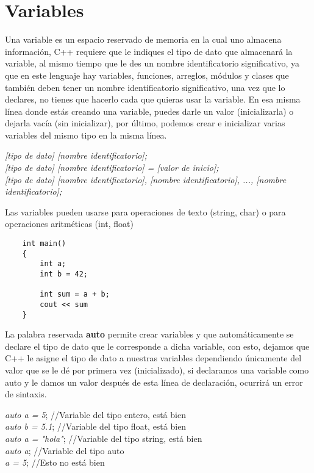 \section{Variables}
Una variable es un espacio reservado de memoria en la cual uno almacena información, C++ requiere que le indiques el tipo de dato que almacenará la variable, al mismo tiempo que le des un nombre identificatorio significativo, ya que en este lenguaje hay variables, funciones, arreglos, módulos y clases que también deben tener un nombre identificatorio significativo, una vez que lo declares, no tienes que hacerlo cada que quieras usar la variable. En esa misma línea donde estás creando una variable, puedes darle un valor (inicializarla) o dejarla vacía (sin inicializar), por último, podemos crear e inicializar varias variables del mismo tipo en la misma línea.
\begin{center}
    \textit{[tipo de dato] [nombre identificatorio];}\\
    \textit{[tipo de dato] [nombre identificatorio] = [valor de inicio];}\\
    \textit{[tipo de dato] [nombre identificatorio], [nombre identificatorio], ..., [nombre identificatorio];}
\end{center}
Las variables pueden usarse para operaciones de texto (string, char) o para operaciones aritméticas (int, float)
\begin{lstlisting}
    int main()
    {
        int a;
        int b = 42;
        
        int sum = a + b;
        cout << sum
    }
\end{lstlisting}
La palabra reservada \textbf{auto} permite crear variables y que automáticamente se declare el tipo de dato que le corresponde a dicha variable, con esto, dejamos que C++ le asigne el tipo de dato a nuestras variables dependiendo únicamente del valor que se le dé por primera vez (inicializado), si declaramos una variable como auto y le damos un valor después de esta línea de declaración, ocurrirá un error de sintaxis.
\begin{center}
    \textit{auto a = 5}; //Variable del tipo entero, está bien\\
    \textit{auto b = 5.1}; //Variable del tipo float, está bien\\
    \textit{auto a = "hola"}; //Variable del tipo string, está bien\\
    \textit{auto a}; //Variable del tipo auto\\
    \textit{a = 5}; //Esto no está bien
\end{center}

